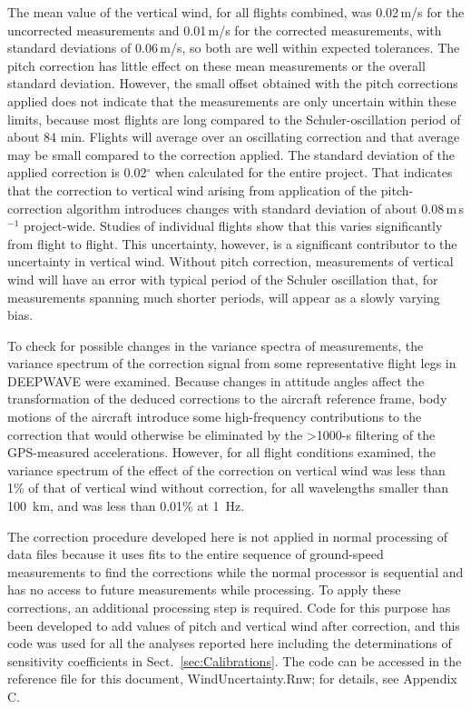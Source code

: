 \documentclass[12pt,twoside,english]{article}\usepackage[]{graphicx}\usepackage[]{color}
\let\OrgIndex\index
\renewcommand*{\index}[1]{\OrgIndex{#1}}
\begin{document}
{{\begin{center}
\par\end{center}


The mean value of the vertical wind, for all flights combined, was 
0.02\,m/s for the uncorrected measurements and 0.01\,m/s for the corrected measurements, with standard deviations of  
0.06\,m/s,  so both are well within expected tolerances. The pitch correction has little effect on these mean measurements or the overall standard deviation.  However, the small offset obtained with the pitch corrections applied does not indicate that the measurements are only uncertain within these limits, because most flights are long compared to the Schuler-oscillation period of about 84 min. Flights will average over an oscillating correction and that average may be small compared to the correction applied. The standard deviation of the applied correction is 0.02$^{\circ}$ when calculated for the entire project. That indicates that the correction to vertical wind arising from application of the pitch-correction algorithm introduces changes with standard deviation of about 
0.08\,m\,s$^{-1}$  project-wide. Studies of individual flights  show that this varies significantly from flight to flight. This uncertainty, however, is a significant contributor to the uncertainty in vertical wind.  Without pitch correction, measurements of vertical wind  will have an error with typical period of the Schuler oscillation that, for measurements spanning much shorter periods, will appear as a slowly varying bias.

To check for possible changes in the variance spectra of measurements, the variance spectrum of the correction signal from some representative flight legs in DEEPWAVE were examined. Because changes in attitude angles affect the transformation of the deduced corrections to the aircraft reference frame, body motions of the aircraft introduce some high-frequency contributions to the correction that would otherwise be eliminated by the >1000-s filtering of the GPS-measured accelerations. However, for all flight conditions examined, the variance spectrum of the effect of the correction on vertical wind was less than 1\% of that of vertical wind without correction, for all wavelengths smaller than 100\ km, and was less than 0.01\% at 1\ Hz.

The correction procedure developed here is not applied in normal processing of data files because it uses fits to the entire sequence of ground-speed measurements to find the corrections while the normal processor is sequential and has no access to future measurements while processing. To apply these corrections, an additional processing step is required. Code for this purpose has been developed to add values of pitch and vertical wind after correction, and this code was used for all the analyses reported here including the determinations of sensitivity coefficients in Sect.~\ref{sec:Calibrations}. The code can be accessed in the reference file for this document, WindUncertainty.Rnw; for details, see Appendix C.

}}
\end{document}
